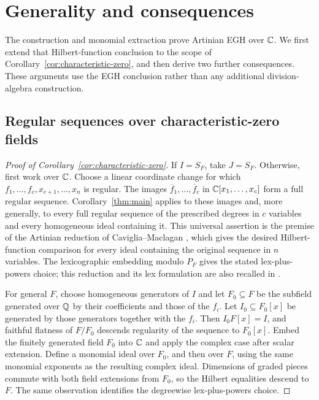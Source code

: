 \section{Generality and consequences}\label{sec:consequences}

The construction and monomial extraction prove Artinian EGH over
\(\mathbb C\). We first extend that Hilbert-function conclusion to the scope
of Corollary~\ref{cor:characteristic-zero}, and then derive two further
consequences. These arguments use the EGH conclusion rather than any
additional division-algebra construction.

\subsection{Regular sequences over characteristic-zero fields}
\label{subsec:generality}

\begin{proof}[Proof of Corollary~\ref{cor:characteristic-zero}]
If \(I=S_F\), take \(J=S_F\). Otherwise, first work over \(\mathbb C\).
Choose a linear coordinate change for which
\(f_1,\ldots,f_c,x_{c+1},\ldots,x_n\) is regular. The images
\(\overline f_1,\ldots,\overline f_c\) in
\(\mathbb C[x_1,\ldots,x_c]\) form a full regular sequence.
Corollary~\ref{thm:main} applies to these images and, more generally,
to every full regular sequence of the prescribed degrees in \(c\)
variables and every homogeneous ideal containing it. This universal
assertion is the premise of the Artinian reduction of
Caviglia--Maclagan \cite[Proposition~10]{CM08}, which gives the desired
Hilbert-function comparison for every ideal containing the original
sequence in \(n\) variables. The lexicographic embedding modulo \(P_F\) gives the stated
lex-plus-powers choice; this reduction and its lex formulation are also
recalled in \cite[Section~4]{CK14}.

For general \(F\), choose homogeneous generators of \(I\) and let
\(F_0\subseteq F\) be the subfield generated over \(\mathbb Q\) by their
coefficients and those of the \(f_i\). Let \(I_0\subseteq F_0[x]\) be
generated by those generators together with the \(f_i\). Then
\(I_0F[x]=I\), and faithful flatness of \(F/F_0\) descends regularity
of the sequence to \(F_0[x]\). Embed the finitely generated field
\(F_0\) into \(\mathbb C\) and apply the complex case after scalar extension.
Define a monomial ideal over \(F_0\), and then over \(F\), using the same
monomial exponents as the resulting complex ideal. Dimensions of graded
pieces commute with both field extensions from \(F_0\), so the Hilbert
equalities descend to \(F\). The same observation identifies the
degreewise lex-plus-powers choice.
\end{proof}

